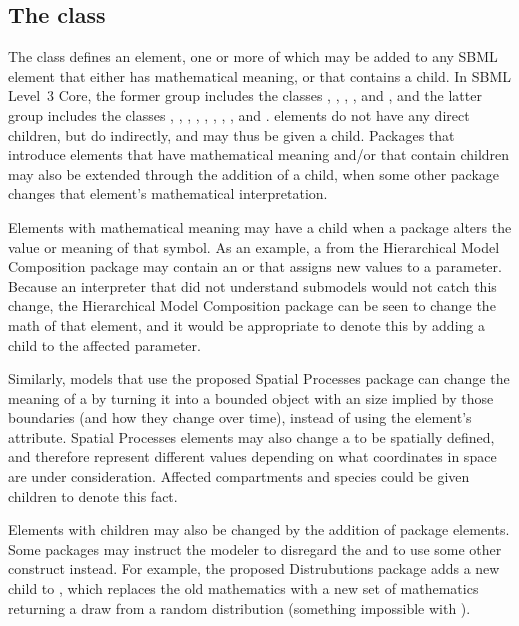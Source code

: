 \subsection{The  class}
\label{mathchangedclaim-class}

The \MathChangedClaim class defines an element, one or more of which may be added to any SBML element that either has mathematical meaning, or that contains a \Math child.  In SBML Level~3 Core, the former group includes the classes \Compartment, \Parameter, \Reaction, \Species, and \SpeciesReference, and the latter group includes the classes \Constraint, \Delay, \EventAssignment, \FunctionDefinition, \InitialAssignment, \KineticLaw, \Priority, \Rule, and \Trigger.  \Event elements do not have any direct \Math children, but do indirectly, and may thus be given a \MathChangedClaim child.  Packages that introduce elements that have mathematical meaning and/or that contain \Math children may also be extended through the addition of a \MathChangedClaim child, when some other package changes that element's mathematical interpretation.

Elements with mathematical meaning may have a \MathChangedClaim child when a package alters the value or meaning of that symbol.  As an example, a \Submodel from the Hierarchical Model Composition package may contain an \Event or \Rule that assigns new values to a parameter.  Because an interpreter that did not understand submodels would not catch this change, the Hierarchical Model Composition package can be seen to change the math of that element, and it would be appropriate to denote this by adding a \MathChangedClaim child to the affected parameter.

Similarly, models that use the proposed Spatial Processes package can change the meaning of a \Compartment by turning it into a bounded object with an size implied by those boundaries (and how they change over time), instead of using the element's  attribute.  Spatial Processes elements may also change a \Species to be spatially defined, and therefore represent different values depending on what coordinates in space are under consideration.  Affected compartments and species could be given \MathChangedClaim children to denote this fact.

Elements with \Math children may also be changed by the addition of package elements.  Some packages may instruct the modeler to disregard the \Math and to use some other construct instead.  For example, the proposed Distrubutions package adds a new child to \FunctionDefinition, which replaces the old mathematics with a new set of mathematics returning a draw from a random distribution (something impossible with \Math).

